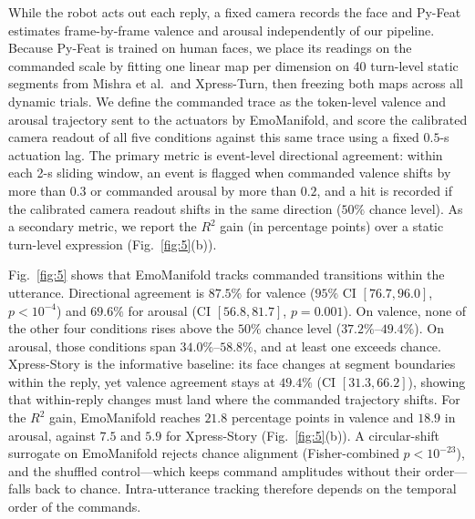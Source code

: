 \documentclass[letterpaper, 10 pt, conference]{ieeeconf}
\begin{document}
While the robot acts out each reply, a fixed camera records the face and Py-Feat~\cite{cheong2023pyfeat} estimates frame-by-frame valence and arousal independently of our pipeline. Because Py-Feat is trained on human faces, we place its readings on the commanded scale by fitting one linear map per dimension on 40 turn-level static segments from Mishra et al.\ and Xpress-Turn, then freezing both maps across all dynamic trials. We define the commanded trace as the token-level valence and arousal trajectory sent to the actuators by EmoManifold, and score the calibrated camera readout of all five conditions against this same trace using a fixed $0.5$-s actuation lag. The primary metric is event-level directional agreement: within each 2-s sliding window, an event is flagged when commanded valence shifts by more than $0.3$ or commanded arousal by more than $0.2$, and a hit is recorded if the calibrated camera readout shifts in the same direction ($50\%$ chance level). As a secondary metric, we report the $R^2$ gain (in percentage points) over a static turn-level expression (Fig.~\ref{fig:5}(b)).

Fig.~\ref{fig:5} shows that EmoManifold tracks commanded transitions within the utterance. Directional agreement is $87.5\%$ for valence ($95\%$ CI $[76.7,96.0]$, $p<10^{-4}$) and $69.6\%$ for arousal (CI $[56.8,81.7]$, $p{=}0.001$). On valence, none of the other four conditions rises above the $50\%$ chance level ($37.2\%$--$49.4\%$). On arousal, those conditions span $34.0\%$--$58.8\%$, and at least one exceeds chance. Xpress-Story is the informative baseline: its face changes at segment boundaries within the reply, yet valence agreement stays at $49.4\%$ (CI $[31.3,66.2]$), showing that within-reply changes must land where the commanded trajectory shifts. For the $R^2$ gain, EmoManifold reaches $21.8$ percentage points in valence and $18.9$ in arousal, against $7.5$ and $5.9$ for Xpress-Story (Fig.~\ref{fig:5}(b)). A circular-shift surrogate on EmoManifold rejects chance alignment (Fisher-combined $p<10^{-23}$), and the shuffled control---which keeps command amplitudes without their order---falls back to chance. Intra-utterance tracking therefore depends on the temporal order of the commands.
\end{document}

